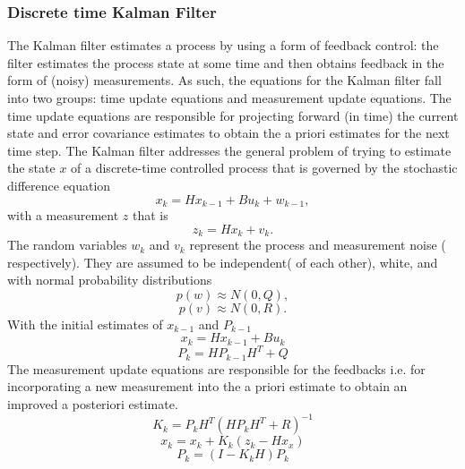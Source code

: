 \documentclass[a4paper,10pt]{report}
\begin{document}
\subsubsection{Discrete time Kalman Filter}
The Kalman filter estimates a process by using a form of feedback control: the filter estimates the process state at some time and
then obtains feedback in the form of (noisy) measurements. As such, the equations for the Kalman filter fall into two groups: time
update equations and measurement update equations. The time update equations are responsible for projecting forward (in time) the
current state and error covariance estimates to obtain the a priori estimates for the next time step.
\newline
The Kalman filter addresses the general problem of trying to estimate the state $x$ of a discrete-time controlled process that is
governed by the stochastic difference equation 
\begin{equation}
 x_k = Hx_{k-1} + Bu_k + w_{k-1} ,
\end{equation}
with a measurement $z$ that is
\begin{equation}
 z_k = Hx_k + v_k.
\end{equation}
The random variables $w_k$ and $v_k$ represent the process and measurement noise ( respectively). They are assumed to be independent( of each other), white, and with normal probability distributions
\begin{equation}
 p(w) \approx N(0,Q),
\end{equation}
\begin{equation}
 p(v) \approx N(0,R).
\end{equation}
With the initial estimates of $x_{k-1}$ and $P_{k-1}$
\begin{equation}
x_k = Hx_{k-1} + Bu_k
\end{equation}
\begin{equation}
P_k = HP_{k-1}H^T + Q
\end{equation}
The measurement update equations are responsible for the feedbacks i.e. for incorporating a new measurement into the a priori estimate
to obtain an improved a posteriori estimate.
\begin{equation}
K_k = P_kH^T(HP_kH^T + R)^{-1} \label{kalmangain}
\end{equation}
\begin{equation}
x_k = x_k + K_k(z_k - Hx_x)
\end{equation}
\begin{equation}
P_k = (I-K_kH)P_k
\end{equation}
\end{document}
